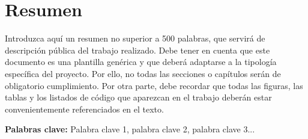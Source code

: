 \newpage{\ }
\thispagestyle{empty}
\chapter*{Resumen}

\noindent Introduzca aquí un resumen no superior a 500 palabras, que servirá de descripción pública del trabajo realizado. Debe tener en cuenta que este documento es una plantilla genérica y que deberá adaptarse a la tipología específica del proyecto. Por ello, no todas las secciones o capítulos serán de obligatorio cumplimiento. 
Por otra parte, debe recordar que todas las figuras, las tablas y los listados de código que aparezcan en el trabajo deberán estar convenientemente referenciados en el texto.

\vspace{.5cm}

\noindent \textbf{Palabras clave:} Palabra clave 1, palabra clave 2, palabra clave 3...